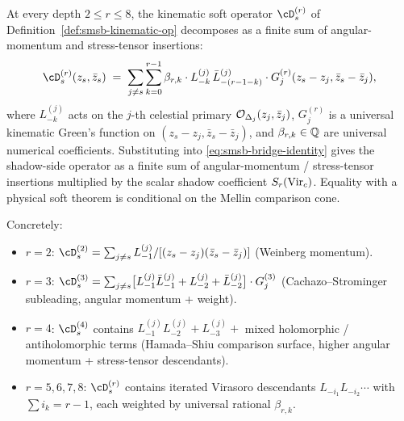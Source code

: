 \begin{theorem}
\label{thm:angular-momentum-stress-tensor-via-shadow}
\ClaimStatusProvedHere
At every depth $2 \leq r \leq 8$, the kinematic soft operator
$\cD_s^{(r)}$ of
Definition~\ref{def:smsb-kinematic-op} decomposes as a finite sum of
angular-momentum and stress-tensor insertions:
\[
 \cD_s^{(r)}(z_s, \bar z_s)
 \;=\;
 \sum_{j \neq s}
 \sum_{k = 0}^{r - 1}
 \beta_{r, k}\cdot
 L_{-k}^{(j)}\, \bar L_{-(r - 1 - k)}^{(j)}
 \cdot G_j^{(r)}(z_s - z_j, \bar z_s - \bar z_j),
\]
where $L_{-k}^{(j)}$ acts on the $j$-th celestial primary
$\mathcal O_{\Delta_j}(z_j, \bar z_j)$, $G_j^{(r)}$ is a universal
kinematic Green's function on $(z_s - z_j, \bar z_s - \bar z_j)$, and
$\beta_{r, k} \in \mathbb Q$ are universal numerical coefficients.
Substituting into \eqref{eq:smsb-bridge-identity} gives the
shadow-side operator as a finite sum of angular-momentum /
stress-tensor insertions multiplied by the scalar shadow coefficient
$S_r(\mathrm{Vir}_c)$.  Equality with a physical soft theorem is conditional
on the Mellin comparison cone.

Concretely:
\begin{itemize}
\item $r = 2$: $\cD_s^{(2)} = \sum_{j \neq s}
L_{-1}^{(j)} / [(z_s - z_j)(\bar z_s - \bar z_j)]$ (Weinberg
momentum).
\item $r = 3$: $\cD_s^{(3)} = \sum_{j \neq s}
\bigl[L_{-1}^{(j)} \bar L_{-1}^{(j)} + L_{-2}^{(j)} +
\bar L_{-2}^{(j)}\bigr]\cdot G_j^{(3)}$ (Cachazo--Strominger
subleading, angular momentum + weight).
\item $r = 4$: $\cD_s^{(4)}$ contains $L_{-1}^{(j)} L_{-2}^{(j)}
+ L_{-3}^{(j)} + $ mixed holomorphic / antiholomorphic terms
(Hamada--Shiu comparison surface, higher angular momentum + stress-tensor
descendants).
\item $r = 5, 6, 7, 8$: $\cD_s^{(r)}$ contains iterated Virasoro
descendants $L_{-i_1} L_{-i_2} \cdots$ with $\sum i_k = r - 1$,
each weighted by universal rational $\beta_{r, k}$.
\end{itemize}
\end{theorem}

